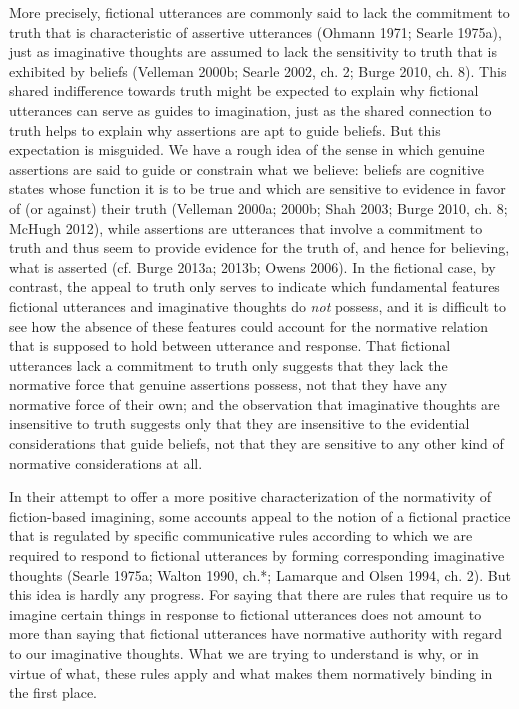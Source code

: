 More precisely, fictional utterances are commonly said to lack the commitment to truth that is characteristic of assertive utterances (Ohmann 1971; Searle 1975a), just as imaginative thoughts are assumed to lack the sensitivity to truth that is exhibited by beliefs (Velleman 2000b; Searle 2002, ch. 2; Burge 2010, ch. 8). This shared indifference towards truth might be expected to explain why fictional utterances can serve as guides to imagination, just as the shared connection to truth helps to explain why assertions are apt to guide beliefs. But this expectation is misguided. We have a rough idea of the sense in which genuine assertions are said to guide or constrain what we believe: beliefs are cognitive states whose function it is to be true and which are sensitive to evidence in favor of (or against) their truth (Velleman 2000a; 2000b; Shah 2003; Burge 2010, ch. 8; McHugh 2012), while assertions are utterances that involve a commitment to truth and thus seem to provide evidence for the truth of, and hence for believing, what is asserted (cf. Burge 2013a; 2013b; Owens 2006). In the fictional case, by contrast, the appeal to truth only serves to indicate which fundamental features fictional utterances and imaginative thoughts do \emph{not} possess, and it is difficult to see how the absence of these features could account for the normative relation that is supposed to hold between utterance and response. That fictional utterances lack a commitment to truth only suggests that they lack the normative force that genuine assertions possess, not that they have any normative force of their own; and the observation that imaginative thoughts are insensitive to truth suggests only that they are insensitive to the evidential considerations that guide beliefs, not that they are sensitive to any other kind of normative considerations at all.

In their attempt to offer a more positive characterization of the normativity of fiction-based imagining, some accounts appeal to the notion of a fictional practice that is regulated by specific communicative rules according to which we are required to respond to fictional utterances by forming corresponding imaginative thoughts (Searle 1975a; Walton 1990, ch.*; Lamarque and Olsen 1994, ch. 2). But this idea is hardly any progress. For saying that there are rules that require us to imagine certain things in response to fictional utterances does not amount to more than saying that fictional utterances have normative authority with regard to our imaginative thoughts. What we are trying to understand is why, or in virtue of what, these rules apply and what makes them normatively binding in the first place.

